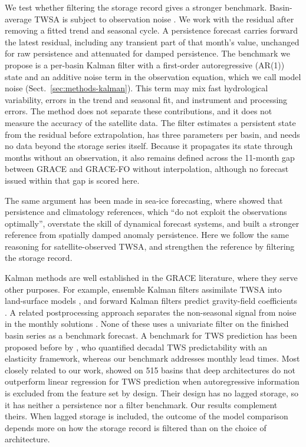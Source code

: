 \documentclass[hess, manuscript]{copernicus}
\begin{document}
We test whether filtering the storage record gives a stronger benchmark.
Basin-average TWSA is subject to observation noise
\citep{save2016mascons, landerer2020gracefo}. We work with the residual
after removing a fitted trend and seasonal cycle. A persistence forecast
carries forward the latest residual, including any transient part of that
month's value, unchanged for raw persistence and attenuated for damped
persistence. The benchmark we propose is a per-basin Kalman filter
\citep{kalman1960} with a first-order autoregressive (AR(1)) state and an
additive noise term in the observation equation, which we call model
noise (Sect.~\ref{sec:methods-kalman}). This term may mix fast
hydrological variability, errors in the trend and seasonal fit, and
instrument and processing errors. The method does not separate these
contributions, and it does not measure the accuracy of the satellite data.
The filter estimates a persistent state from the residual before
extrapolation, has three parameters per basin, and needs no data beyond
the storage series itself. Because it propagates its state through months
without an observation, it also remains defined across the 11-month gap
between GRACE and GRACE-FO without interpolation, although no forecast
issued within that gap is scored here.

The same argument has been made in sea-ice forecasting, where
\citet{niraula2021seaice} showed that persistence and climatology
references, which ``do not exploit the observations optimally'', overstate
the skill of dynamical forecast systems, and built a stronger reference
from spatially damped anomaly persistence. Here we follow the same reasoning for satellite-observed TWSA, and strengthen the reference by filtering the storage record.

Kalman methods are well established in the GRACE literature, where they serve other purposes. For example, ensemble Kalman filters
assimilate TWSA into land-surface models \citep{springer2026review},
and forward Kalman filters predict gravity-field coefficients
\citep{kankanige2026persistence}. A related postprocessing approach
separates the non-seasonal signal from noise in the monthly solutions
\citep{zhang2025ipa}. None of these uses a univariate filter on the
finished basin series as a benchmark forecast. A benchmark for TWS prediction has been proposed before by \citet{zhu2019elasticity}, who quantified decadal TWS predictability with an elasticity framework, whereas our benchmark addresses monthly lead times. Most closely related to our work, \citet{nie2025linear} showed on 515 basins that
deep architectures do not outperform linear regression for TWS prediction when
autoregressive information is excluded from the feature set by design.
Their design has no lagged storage, so it has neither a persistence nor a
filter benchmark. Our results complement theirs. When lagged storage is included, the
outcome of the model comparison depends more on how the storage record is
filtered than on the choice of architecture.
\end{document}
